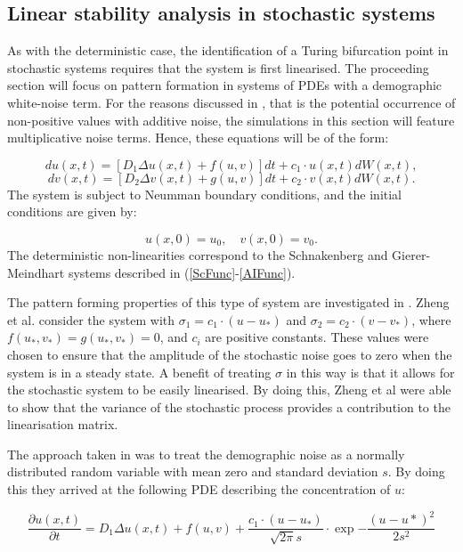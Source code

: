 \documentclass[12pt]{article}
\begin{document}
\subsection{Linear stability analysis in stochastic systems}
As with the deterministic case, the identification of a Turing bifurcation point in stochastic systems requires that the system is first linearised. The proceeding section will focus on pattern formation in systems of PDEs with a demographic white-noise term. For the reasons discussed in , that is the potential occurrence of non-positive values with additive noise, the simulations in this section will feature multiplicative noise terms. Hence, these equations will be of the form:

\begin{equation} \label{spde1}
d u(x,t) = [D_1\Delta u(x,t) + f(u,v)]d t + c_1\cdot u(x,t) 
d W(x,t),
\end{equation}
\begin{equation} \label{spde2}
d v(x,t) = [D_2\Delta v(x,t) + g(u,v)]d t+  c_2\cdot v(x,t) d W(x,t).
\end{equation}
The system is subject to Neumman boundary conditions, and the initial conditions are given by:

$$u(x,0) = u_0, \quad v(x,0) = v_0.$$
The deterministic non-linearities correspond to the Schnakenberg and Gierer-Meindhart systems described in (\ref{ScFunc}-\ref{AIFunc}). 

The pattern forming properties of this type of system are investigated in \cite{Zheng}. Zheng et al. consider the system with $\sigma_1 = c_1 \cdot( u - u_{\ast})$ and $\sigma_2 = c_2 \cdot(v - v_{\ast})$, where $f(u_{\ast}, v_{\ast}) = g(u_{\ast},v_{\ast}) = 0$, and $c_i$ are positive constants. These values were chosen to ensure that the amplitude of the stochastic noise goes to zero when the system is in a steady state. A benefit of treating $\sigma$ in this way is that it allows for the stochastic system to be easily linearised. By doing this, Zheng et al were able to show that the variance of the stochastic process provides a contribution to the linearisation matrix. 

The approach taken in \cite{Zheng} was to treat the demographic noise as a normally distributed random variable with mean zero and standard deviation $s$. By doing this they arrived at the following PDE describing the concentration of $u$:

\begin{equation} \label{spde1}
\frac{\partial u(x,t)}{\partial t} = D_1\Delta u(x,t) + f(u,v) + \frac{c_1\cdot(u - u_\ast)}{\sqrt{2\pi}s}\cdot\exp{-\frac{(u-u\ast)^2}{2s^2}} 
\end{equation}
\end{document}
